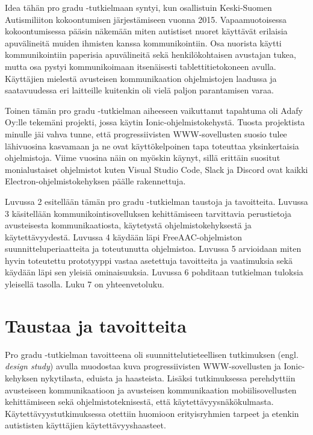 \documentclass[utf8]{gradu3}
\begin{document}
Idea tähän pro gradu -tutkielmaan syntyi, kun osallistuin Keski-Suomen Autismiliiton kokoontumisen järjestämiseen vuonna 2015. Vapaamuotoisessa kokoontumisessa pääsin näkemään miten autistiset nuoret käyttävät erilaisia apuvälineitä muiden ihmisten kanssa kommunikointiin. Osa nuorista käytti kommunikointiin paperisia apuvälineitä sekä henkilökohtaisen avustajan tukea, mutta osa pystyi kommunikoimaan itsenäisesti tablettitietokoneen avulla. Käyttäjien mielestä avusteisen kommunikaation ohjelmistojen laadussa ja saatavuudessa eri laitteille kuitenkin oli vielä paljon parantamisen varaa.

Toinen tämän pro gradu -tutkielman aiheeseen vaikuttanut tapahtuma oli Adafy Oy:lle tekemäni projekti, jossa käytin Ionic-ohjelmistokehystä. Tuosta projektista minulle jäi vahva tunne, että progressiivisten WWW-sovellusten suosio tulee lähivuosina kasvamaan ja ne ovat käyttökelpoinen tapa toteuttaa yksinkertaisia ohjelmistoja. Viime vuosina näin on myöskin käynyt, sillä erittäin suositut monialustaiset ohjelmistot kuten Visual Studio Code, Slack ja Discord ovat kaikki Electron-ohjelmistokehyksen päälle rakennettuja.

Luvussa 2 esitellään tämän pro gradu -tutkielman taustoja ja tavoitteita. Luvussa 3 käsitellään kommunikointisovelluksen kehittämiseen tarvittavia perustietoja avusteisesta kommunikaatiosta, käytetystä ohjelmistokehyksestä ja käytettävyydestä. Luvussa 4 käydään läpi FreeAAC-ohjelmiston suunnitteluperiaatteita ja toteutunutta ohjelmistoa. Luvussa 5 arvioidaan miten hyvin toteutettu prototyyppi vastaa asetettuja tavoitteita ja vaatimuksia sekä käydään läpi sen yleisiä ominaisuuksia. Luvussa 6 pohditaan tutkielman tuloksia yleisellä tasolla. Luku 7 on yhteenvetoluku.

\chapter{Taustaa ja tavoitteita}

Pro gradu -tutkielman tavoitteena oli suunnittelutieteellisen tutkimuksen (engl. \textit{design study}) avulla muodostaa kuva progressiivisten WWW-sovellusten ja Ionic-kehyksen nykytilasta, eduista ja haasteista. Lisäksi tutkimuksessa perehdyttiin avusteiseen kommunikaatioon ja avusteisen kommunikaation mobiilisovellusten kehittämiseen sekä ohjelmistoteknisestä, että käytettävyysnäkökulmasta. Käytettävyystutkimuksessa otettiin huomioon erityisryhmien tarpeet ja etenkin autististen käyttäjien käytettävyyshaasteet.
\end{document}

